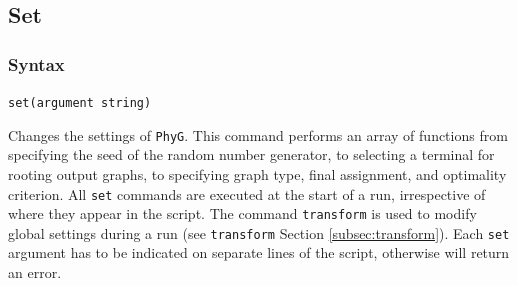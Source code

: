 \subsection{Set}
\label{subsec:set}
	\subsubsection{Syntax}
		\texttt{set(argument string)}
	
	\begin{phygdescription}
		{Changes the settings of \texttt{PhyG}. This command performs an array of functions
		from specifying the seed of the random number generator, to selecting a terminal for
		rooting output graphs, to specifying  graph type, final assignment, and optimality 
		criterion. All \texttt{set} commands are executed at the start of a run, irrespective of
		where they appear in the script. The command \texttt{transform} is used to modify 
		global settings during a run (see \texttt{transform} Section \ref{subsec:transform}).
		Each \texttt{set} argument has to be indicated on separate lines of the script, otherwise
		\phyg will return an error.}
	\end{phygdescription}
			
